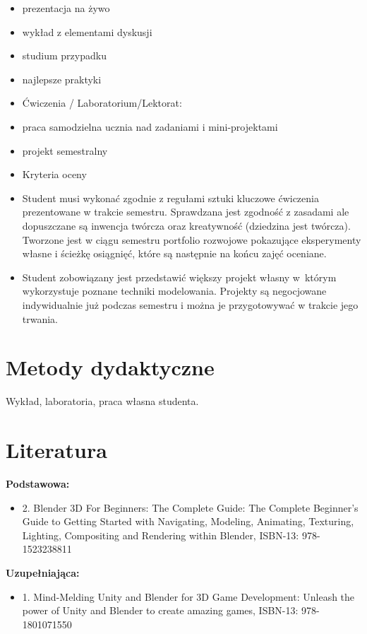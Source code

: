 \documentclass[12pt, a4paper]{article}
\begin{document}
\begin{itemize}
  \item prezentacja na żywo
  \item wykład z elementami dyskusji
  \item studium przypadku
  \item najlepsze praktyki
  \item Ćwiczenia / Laboratorium/Lektorat:
  \item praca samodzielna ucznia nad zadaniami i mini-projektami
  \item projekt semestralny
  \item Kryteria oceny
  \item Student musi wykonać zgodnie z regułami sztuki kluczowe ćwiczenia prezentowane w trakcie semestru. Sprawdzana jest zgodność z zasadami ale dopuszczane są inwencja twórcza oraz kreatywność (dziedzina jest twórcza). Tworzone jest w ciągu semestru portfolio rozwojowe pokazujące eksperymenty własne i ścieżkę osiągnięć, które są następnie na końcu zajęć oceniane.
  \item Student zobowiązany jest przedstawić większy projekt własny w którym wykorzystuje poznane techniki modelowania. Projekty są negocjowane indywidualnie już podczas semestru i można je przygotowywać w trakcie jego trwania.
\end{itemize}

\section{Metody dydaktyczne}

Wykład, laboratoria, praca własna studenta.

\section{Literatura}

\textbf{Podstawowa:}
\begin{itemize}
  \item 2. Blender 3D For Beginners: The Complete Guide: The Complete Beginner’s Guide to Getting Started with Navigating, Modeling, Animating, Texturing, Lighting, Compositing and Rendering within Blender, ISBN-13: 978-1523238811
\end{itemize}

\textbf{Uzupełniająca:}
\begin{itemize}
  \item 1. Mind-Melding Unity and Blender for 3D Game Development: Unleash the power of Unity and Blender to create amazing games, ISBN-13: 978-1801071550
\end{itemize}
\end{document}
